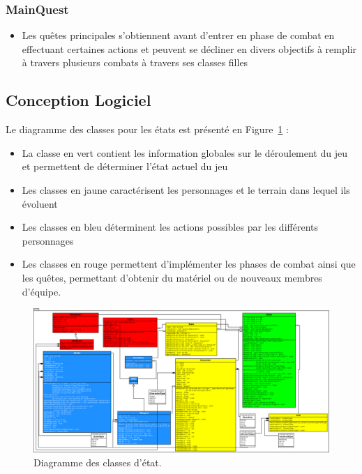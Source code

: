 \documentclass[a4paper,12pt]{article}
\begin{document}
\subsubsection{MainQuest}
\begin{itemize}
\item Les quêtes principales s'obtiennent avant d'entrer en phase de combat en effectuant certaines actions et peuvent se décliner en divers objectifs à remplir à travers plusieurs combats à travers ses classes filles
\end{itemize}


\subsection{Conception Logiciel}
Le diagramme des classes pour les états est présenté en Figure~\ref{uml:state} : 
\begin{itemize}
\item La classe en vert contient les information globales sur le déroulement du jeu et permettent de déterminer l'état actuel du jeu
\item Les classes en jaune caractérisent les personnages et le terrain dans lequel ils évoluent
\item Les classes en bleu déterminent les actions possibles par les différents personnages
\item Les classes en rouge permettent d'implémenter les phases de combat ainsi que les quêtes, permettant d'obtenir du matériel ou de nouveaux membres d'équipe.
\end{itemize}

\begin{landscape}
    \begin{figure}[p]
        \centering
        \includegraphics[width=0.9\paperheight,keepaspectratio]{state.png}
        \caption{\label{uml:state}Diagramme des classes d'état.} 
    \end{figure}
\end{landscape}
\end{document}
